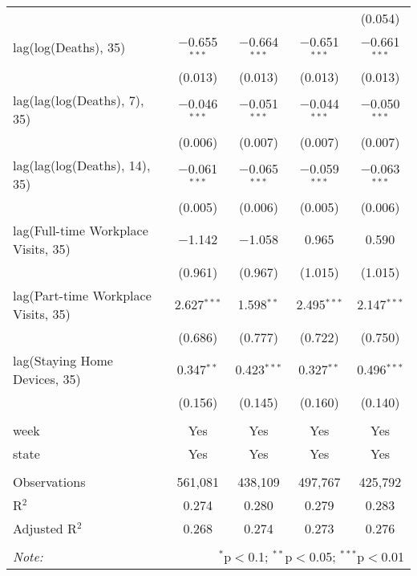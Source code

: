 \begin{tabular}{@{\extracolsep{1pt}}lcccc}
  &  &  &  & (0.054) \\ 
  lag(log(Deaths), 35) & $-$0.655$^{***}$ & $-$0.664$^{***}$ & $-$0.651$^{***}$ & $-$0.661$^{***}$ \\ 
  & (0.013) & (0.013) & (0.013) & (0.013) \\ 
  lag(lag(log(Deaths), 7), 35) & $-$0.046$^{***}$ & $-$0.051$^{***}$ & $-$0.044$^{***}$ & $-$0.050$^{***}$ \\ 
  & (0.006) & (0.007) & (0.007) & (0.007) \\ 
  lag(lag(log(Deaths), 14), 35) & $-$0.061$^{***}$ & $-$0.065$^{***}$ & $-$0.059$^{***}$ & $-$0.063$^{***}$ \\ 
  & (0.005) & (0.006) & (0.005) & (0.006) \\ 
  lag(Full-time Workplace Visits, 35) & $-$1.142 & $-$1.058 & 0.965 & 0.590 \\ 
  & (0.961) & (0.967) & (1.015) & (1.015) \\ 
  lag(Part-time Workplace Visits, 35) & 2.627$^{***}$ & 1.598$^{**}$ & 2.495$^{***}$ & 2.147$^{***}$ \\ 
  & (0.686) & (0.777) & (0.722) & (0.750) \\ 
  lag(Staying Home Devices, 35) & 0.347$^{**}$ & 0.423$^{***}$ & 0.327$^{**}$ & 0.496$^{***}$ \\ 
  & (0.156) & (0.145) & (0.160) & (0.140) \\ 
 \hline \\[-1.8ex] 
week & Yes & Yes & Yes & Yes \\ 
state & Yes & Yes & Yes & Yes \\ 
\hline \\[-1.8ex] 
Observations & 561,081 & 438,109 & 497,767 & 425,792 \\ 
R$^{2}$ & 0.274 & 0.280 & 0.279 & 0.283 \\ 
Adjusted R$^{2}$ & 0.268 & 0.274 & 0.273 & 0.276 \\ 
\hline 
\hline \\[-1.8ex] 
\textit{Note:}  & \multicolumn{4}{r}{$^{*}$p$<$0.1; $^{**}$p$<$0.05; $^{***}$p$<$0.01} \\ 
\end{tabular} 